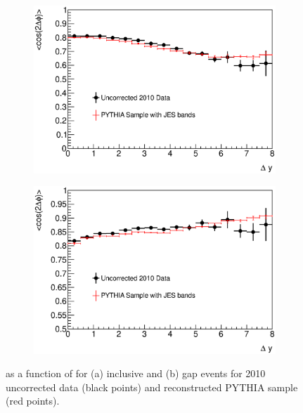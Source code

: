 \begin{figure}
\centering
        \begin{subfigure}[b]{0.5\textwidth}
                \centering
                \includegraphics[width=\textwidth]{figures/GBJ2/ControlPlots/Smeared__cos2dPhi_deltaY.eps}
        \end{subfigure}%
        \begin{subfigure}[b]{0.5\textwidth}
                \centering
                \includegraphics[width=\textwidth]{figures/GBJ2/ControlPlots/Smeared__cos2dPhi_deltaY_gap.eps}
        \end{subfigure}%
\caption[Comparison of the data and PYTHIA for \costwodphi{}]{
\mean{\costwodphi{}} as a function of \dy{} for (a) inclusive and (b) gap events for 2010 uncorrected data (black points) and reconstructed PYTHIA sample (red points).
\label{GBJ2:Uncorr:cos2}}
\end{figure}

